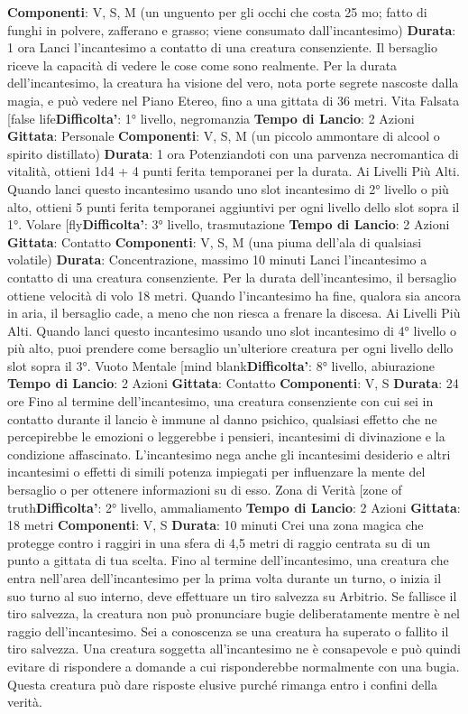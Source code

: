 \begin{multicols}{2}
\textbf{Componenti}: V, S, M (un unguento per gli occhi che
costa 25 mo; fatto di funghi in polvere, zafferano e
grasso; viene consumato dall’incantesimo)
\textbf{Durata}: 1 ora
Lanci l’incantesimo a contatto di una creatura
consenziente. Il bersaglio riceve la capacità di vedere le
cose come sono realmente. Per la durata
dell’incantesimo, la creatura ha visione del vero, nota
porte segrete nascoste dalla magia, e può vedere nel
Piano Etereo, fino a una gittata di 36 metri.
Vita Falsata
[false life\textbf{Difficolta'}:
1° livello, negromanzia
\textbf{Tempo di Lancio}: 2 Azioni
\textbf{Gittata}: Personale
\textbf{Componenti}: V, S, M (un piccolo ammontare di alcool
o spirito distillato)
\textbf{Durata}: 1 ora
Potenziandoti con una parvenza necromantica di
vitalità, ottieni 1d4 + 4 punti ferita temporanei per la
durata.
Ai Livelli Più Alti. Quando lanci questo incantesimo
usando uno slot incantesimo di 2° livello o più alto,
ottieni 5 punti ferita temporanei aggiuntivi per ogni
livello dello slot sopra il 1°.
Volare
[fly\textbf{Difficolta'}:
3° livello, trasmutazione
\textbf{Tempo di Lancio}: 2 Azioni
\textbf{Gittata}: Contatto
\textbf{Componenti}: V, S, M (una piuma dell’ala di qualsiasi
volatile)
\textbf{Durata}: Concentrazione, massimo 10 minuti
Lanci l’incantesimo a contatto di una creatura
consenziente. Per la durata dell’incantesimo, il
bersaglio ottiene velocità di volo 18 metri. Quando
l’incantesimo ha fine, qualora sia ancora in aria, il
bersaglio cade, a meno che non riesca a frenare la
discesa.
Ai Livelli Più Alti. Quando lanci questo incantesimo
usando uno slot incantesimo di 4° livello o più alto, puoi
prendere come bersaglio un’ulteriore creatura per ogni
livello dello slot sopra il 3°.
Vuoto Mentale
[mind blank\textbf{Difficolta'}:
8° livello, abiurazione
\textbf{Tempo di Lancio}: 2 Azioni
\textbf{Gittata}: Contatto
\textbf{Componenti}: V, S
\textbf{Durata}: 24 ore
Fino al termine dell’incantesimo, una creatura
consenziente con cui sei in contatto durante il lancio è
immune al danno psichico, qualsiasi effetto che ne
percepirebbe le emozioni o leggerebbe i pensieri,
incantesimi di divinazione e la condizione affascinato.
L’incantesimo nega anche gli incantesimi desiderio e
altri incantesimi o effetti di simili potenza impiegati per
influenzare la mente del bersaglio o per ottenere
informazioni su di esso.
Zona di Verità
[zone of truth\textbf{Difficolta'}:
2° livello, ammaliamento
\textbf{Tempo di Lancio}: 2 Azioni
\textbf{Gittata}: 18 metri
\textbf{Componenti}: V, S
\textbf{Durata}: 10 minuti
Crei una zona magica che protegge contro i raggiri in
una sfera di 4,5 metri di raggio centrata su di un punto a
gittata di tua scelta. Fino al termine dell’incantesimo,
una creatura che entra nell’area dell’incantesimo per la
prima volta durante un turno, o inizia il suo turno al suo
interno, deve effettuare un tiro salvezza su Arbitrio. Se
fallisce il tiro salvezza, la creatura non può pronunciare
bugie deliberatamente mentre è nel raggio
dell’incantesimo. Sei a conoscenza se una creatura ha
superato o fallito il tiro salvezza.
Una creatura soggetta all’incantesimo ne è
consapevole e può quindi evitare di rispondere a
domande a cui risponderebbe normalmente con una
bugia. Questa creatura può dare risposte elusive
purché rimanga entro i confini della verità.

\end{multicols}